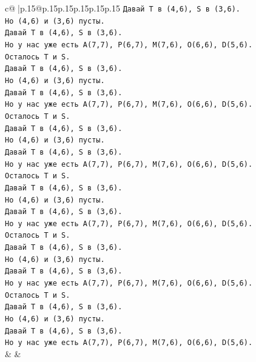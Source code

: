 \documentclass{article}
\begin{document}
{\begin{supertabular}{c@{$\;$}|p{.15\linewidth}@{}p{.15\linewidth}p{.15\linewidth}p{.15\linewidth}p{.15\linewidth}p{.15\linewidth}}
{{{\texttt{Давай T в (4,6), S в (3,6).} \\
\texttt{Но (4,6) и (3,6) пусты.} \\
\texttt{Давай T в (4,6), S в (3,6).} \\
\texttt{Но у нас уже есть A(7,7), P(6,7), M(7,6), O(6,6), D(5,6).} \\
\texttt{Осталось T и S.} \\
\texttt{Давай T в (4,6), S в (3,6).} \\
\texttt{Но (4,6) и (3,6) пусты.} \\
\texttt{Давай T в (4,6), S в (3,6).} \\
\texttt{Но у нас уже есть A(7,7), P(6,7), M(7,6), O(6,6), D(5,6).} \\
\texttt{Осталось T и S.} \\
\texttt{Давай T в (4,6), S в (3,6).} \\
\texttt{Но (4,6) и (3,6) пусты.} \\
\texttt{Давай T в (4,6), S в (3,6).} \\
\texttt{Но у нас уже есть A(7,7), P(6,7), M(7,6), O(6,6), D(5,6).} \\
\texttt{Осталось T и S.} \\
\texttt{Давай T в (4,6), S в (3,6).} \\
\texttt{Но (4,6) и (3,6) пусты.} \\
\texttt{Давай T в (4,6), S в (3,6).} \\
\texttt{Но у нас уже есть A(7,7), P(6,7), M(7,6), O(6,6), D(5,6).} \\
\texttt{Осталось T и S.} \\
\texttt{Давай T в (4,6), S в (3,6).} \\
\texttt{Но (4,6) и (3,6) пусты.} \\
\texttt{Давай T в (4,6), S в (3,6).} \\
\texttt{Но у нас уже есть A(7,7), P(6,7), M(7,6), O(6,6), D(5,6).} \\
\texttt{Осталось T и S.} \\
\texttt{Давай T в (4,6), S в (3,6).} \\
\texttt{Но (4,6) и (3,6) пусты.} \\
\texttt{Давай T в (4,6), S в (3,6).} \\
\texttt{Но у нас уже есть A(7,7), P(6,7), M(7,6), O(6,6), D(5,6).} \\
            }
        }
    }
    & & \\ \\


\end{supertabular}}
\end{document}
